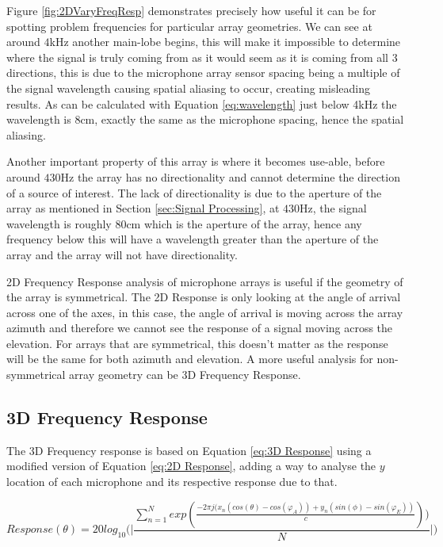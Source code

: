 \documentclass{UoNMCHA}
\numberwithin{equation}{section}
\begin{document}
    Figure \ref{fig:2DVaryFreqResp} demonstrates precisely how useful it can be for spotting problem frequencies for particular array geometries. We can see at around $4$kHz another main-lobe begins, this will make it impossible to determine where the signal is truly coming from as it would seem as it is coming from all 3 directions, this is due to the microphone array sensor spacing being a multiple of the signal wavelength causing spatial aliasing to occur, creating misleading results. As can be calculated with Equation \ref{eq:wavelength} just below 4kHz the wavelength is 8cm, exactly the same as the microphone spacing, hence the spatial aliasing.
    
    Another important property of this array is where it becomes use-able, before around $430$Hz the array has no directionality and cannot determine the direction of a source of interest. The lack of directionality is due to the aperture of the array as mentioned in Section \ref{sec:Signal Processing}, at $430$Hz, the signal wavelength is roughly 80cm which is the aperture of the array, hence any frequency below this will have a wavelength greater than the aperture of the array and the array will not have directionality.
    
    2D Frequency Response analysis of microphone arrays is useful if the geometry of the array is symmetrical. The 2D Response is only looking at the angle of arrival across one of the axes, in this case, the angle of arrival is moving across the array azimuth and therefore we cannot see the response of a signal moving across the elevation. For arrays that are symmetrical, this doesn't matter as the response will be the same for both azimuth and elevation. A more useful analysis for non-symmetrical array geometry can be 3D Frequency Response.
\subsection{3D Frequency Response} \label{sec:3D Freq Response}
    The 3D Frequency response is based on Equation \ref{eq:3D Response} using a modified version of Equation \ref{eq:2D Response}, adding a way to analyse the $y$ location of each microphone and its respective response due to that.
    
    \begin{equation}
        Response(\theta) = 20log_{10} \Big( \Big|\frac{\sum_{n=1}^N exp(\frac{-2\pi j(x_n(cos(\theta)-cos(\varphi_A))+y_n(sin(\phi)-sin(\varphi_E))}{c}))}{N}\Big| \Big)
        \label{eq:3D Response}
    \end{equation}
    
\end{document}
